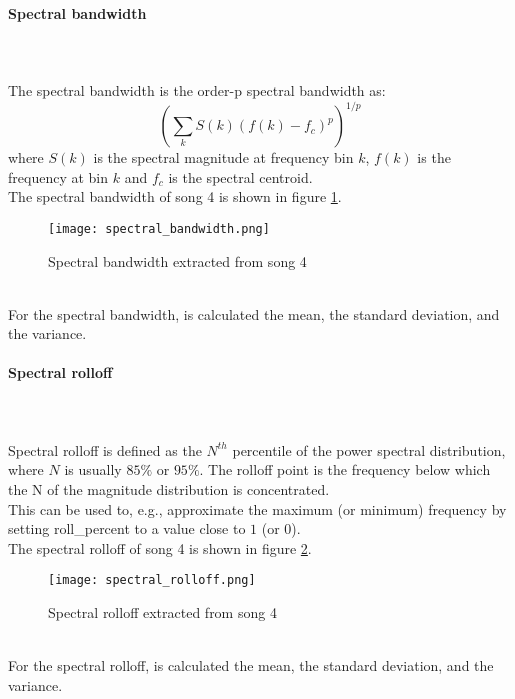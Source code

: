 \paragraph{Spectral bandwidth}
\mbox{} \\ \\
The spectral bandwidth is the order-p spectral bandwidth as:
\begin{equation}
	{\left(\sum_{k}{S(k){(f(k)-f_c)}^p}\right)}^{1/p}
\end{equation}
where $S(k)$ is the spectral magnitude at frequency bin $k$, $f(k)$ is the frequency at bin $k$ and $f_c$ is the spectral centroid.
\\
The spectral bandwidth of song 4 is shown in figure \ref{fig:spectral_bandwidth}.
\begin{figure}[h]
    \centering
    \texttt{[image: spectral\_bandwidth.png]} 
	\caption{Spectral bandwidth extracted from song 4}
    \label{fig:spectral_bandwidth}
\end{figure}
\\
For the spectral bandwidth, is calculated the mean, the standard deviation, and the variance.

\paragraph{Spectral rolloff}
\mbox{} \\ \\
Spectral rolloff is defined as the $N^{th}$ percentile of the power spectral distribution, where $N$ is usually $85 \%$ or $95 \%$. The rolloff point is the frequency below which the N of the magnitude distribution is concentrated.
\\
This can be used to, e.g., approximate the maximum (or minimum) frequency by setting roll\_percent to a value close to $1$ (or $0$).
\\
The spectral rolloff of song 4 is shown in figure \ref{fig:spectral_rolloff}.
\begin{figure}[h]
    \centering
    \texttt{[image: spectral\_rolloff.png]} 
	\caption{Spectral rolloff extracted from song 4}
    \label{fig:spectral_rolloff}
\end{figure}
\\
For the spectral rolloff, is calculated the mean, the standard deviation, and the variance.

